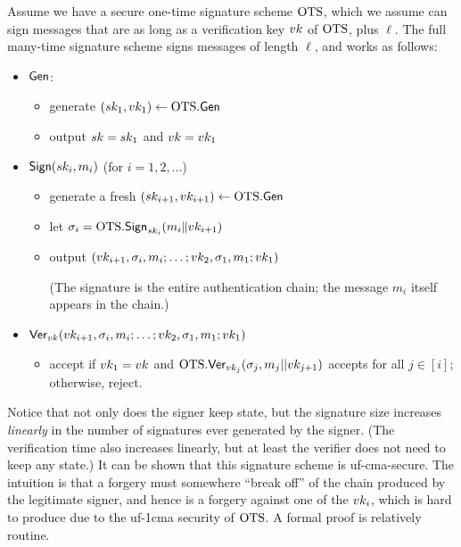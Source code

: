\documentclass[11pt]{article}
\begin{document}
Assume we have a secure one-time signature scheme $\text{OTS}$, which we
assume can sign messages that are as long as a verification key $vk$
of $\text{OTS}$, plus $\ell$.  The full many-time signature scheme signs
messages of length $\ell$, and works as follows:

\begin{itemize}
\item $\mathsf{Gen}$:
  \begin{itemize}
  \item generate $(sk_1,vk_1) \gets \text{OTS}.\mathsf{Gen}$
  \item output $sk = sk_1$ and $vk = vk_1$
  \end{itemize}

\item $\mathsf{Sign}(sk_i,m_i)$ (for $i=1,2, \ldots$)
  \begin{itemize}
  \item generate a fresh $(sk_{i+1}, vk_{i+1}) \gets \text{OTS}.\mathsf{Gen}$
  \item let $\sigma_i = \text{OTS}.\mathsf{Sign}_{sk_{i}}(m_i \| vk_{i+1})$
  \item output $(vk_{i+1}, \sigma_{i}, m_{i}; \ldots; vk_{2},
    \sigma_1, m_1; vk_1)$

    (The signature is the entire authentication chain; the message
    $m_{i}$ itself appears in the chain.)
  \end{itemize}

\item $\mathsf{Ver}_{vk}(vk_{i+1}, \sigma_i,m_i; \ldots; vk_{2},
  \sigma_1, m_1; vk_1)$
  \begin{itemize}
  \item accept if $vk_{1} = vk$ and
    $\text{OTS}.\mathsf{Ver}_{vk_{j}}(\sigma_{j}, m_j||vk_{j+1})$ accepts for
    all $j \in [i]$; otherwise, reject.
  \end{itemize}
\end{itemize}

Notice that not only does the signer keep state, but the signature
size increases \emph{linearly} in the number of signatures ever
generated by the signer.  (The verification time also increases
linearly, but at least the verifier does not need to keep any state.)
It can be shown that this signature scheme is uf-cma-secure.  The
intuition is that a forgery must somewhere ``break off'' of the chain
produced by the legitimate signer, and hence is a forgery against one
of the $vk_{i}$, which is hard to produce due to the uf-1cma security
of $\text{OTS}$.  A formal proof is relatively routine.
\end{document}
